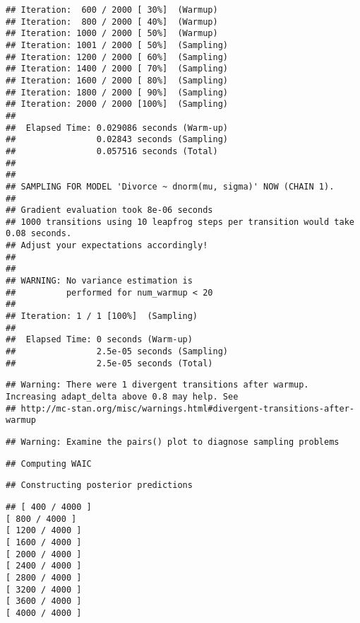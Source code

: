 \documentclass[]{article}
\begin{document}
\begin{verbatim}
## Iteration:  600 / 2000 [ 30%]  (Warmup)
## Iteration:  800 / 2000 [ 40%]  (Warmup)
## Iteration: 1000 / 2000 [ 50%]  (Warmup)
## Iteration: 1001 / 2000 [ 50%]  (Sampling)
## Iteration: 1200 / 2000 [ 60%]  (Sampling)
## Iteration: 1400 / 2000 [ 70%]  (Sampling)
## Iteration: 1600 / 2000 [ 80%]  (Sampling)
## Iteration: 1800 / 2000 [ 90%]  (Sampling)
## Iteration: 2000 / 2000 [100%]  (Sampling)
## 
##  Elapsed Time: 0.029086 seconds (Warm-up)
##                0.02843 seconds (Sampling)
##                0.057516 seconds (Total)
## 
## 
## SAMPLING FOR MODEL 'Divorce ~ dnorm(mu, sigma)' NOW (CHAIN 1).
## 
## Gradient evaluation took 8e-06 seconds
## 1000 transitions using 10 leapfrog steps per transition would take 0.08 seconds.
## Adjust your expectations accordingly!
## 
## 
## WARNING: No variance estimation is
##          performed for num_warmup < 20
## 
## Iteration: 1 / 1 [100%]  (Sampling)
## 
##  Elapsed Time: 0 seconds (Warm-up)
##                2.5e-05 seconds (Sampling)
##                2.5e-05 seconds (Total)
\end{verbatim}

\begin{verbatim}
## Warning: There were 1 divergent transitions after warmup. Increasing adapt_delta above 0.8 may help. See
## http://mc-stan.org/misc/warnings.html#divergent-transitions-after-warmup
\end{verbatim}

\begin{verbatim}
## Warning: Examine the pairs() plot to diagnose sampling problems
\end{verbatim}

\begin{verbatim}
## Computing WAIC
\end{verbatim}

\begin{verbatim}
## Constructing posterior predictions
\end{verbatim}

\begin{verbatim}
## [ 400 / 4000 ]
[ 800 / 4000 ]
[ 1200 / 4000 ]
[ 1600 / 4000 ]
[ 2000 / 4000 ]
[ 2400 / 4000 ]
[ 2800 / 4000 ]
[ 3200 / 4000 ]
[ 3600 / 4000 ]
[ 4000 / 4000 ]
\end{verbatim}
\end{document}
